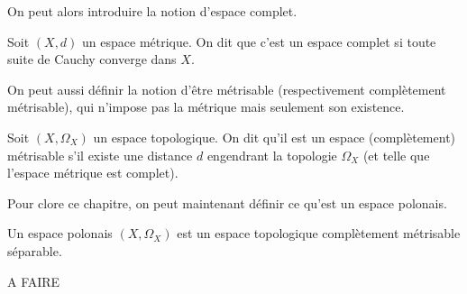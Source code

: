On peut alors introduire la notion d'espace complet.

\begin{definition}
  Soit $(X,d)$ un espace métrique. On dit que c'est un espace complet si toute
  suite de Cauchy converge dans $X$.
\end{definition}

On peut aussi définir la notion d'être métrisable (respectivement complètement
métrisable), qui n'impose pas la métrique mais seulement son existence.

\begin{definition}
  Soit $(X,\Omega_X)$ un espace topologique. On dit qu'il est un espace
  (complètement) métrisable s'il existe une distance $d$ engendrant la topologie
  $\Omega_X$ (et telle que l'espace métrique est complet).
\end{definition}

Pour clore ce chapitre, on peut maintenant définir ce qu'est un espace polonais.

\begin{definition}
  Un espace polonais $(X,\Omega_X)$ est un espace topologique complètement
  métrisable séparable.
\end{definition}

A FAIRE
